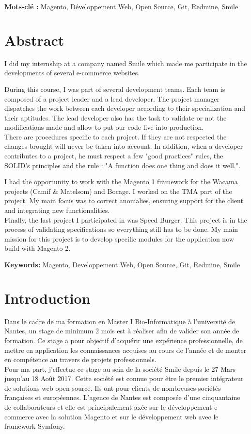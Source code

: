 \documentclass[12pt, a4paper, twoside]{report}
\newcommand{\mychapter}[2]{
	\setcounter{chapter}{#1}
	\setcounter{section}{0}
	\chapter*{#2}
	\addcontentsline{toc}{chapter}{#2}
}
\begin{document}
\textbf{Mots-clé :} Magento, Développement Web, Open Source, Git, Redmine, Smile

\mychapter{-3}{Abstract}

I did my internship at a company named Smile which made me participate in the developments of several e-commerce websites. \vspace{0.1cm}

During this course, I was part of several development teams. Each team is composed of a project leader and a lead developer. The project manager dispatches the work between each developer according to their specialization and their aptitudes. The lead developer also has the task to validate or not the modifications made and allow to put our code live into production. \\
There are procedures specific to each project. If they are not respected the changes brought will never be taken into account. In addition, when a developer contributes to a project, he must respect a few "good practices" rules, the SOLID's principles and the rule : "A function does one thing and does it well.". \vspace{0.1cm}

I had the opportunity to work with the Magento 1 framework for the Wacama projects (Camif \& Matelsom) and Bocage. I worked on the TMA part of the project. My main focus was to correct anomalies, ensuring support for the client and integrating new functionalities. \\

Finally, the last project I participated in was Speed Burger. This project is in the process of validating specifications so everything still has to be done. My main mission for this project is to develop specific modules for the application now build with Magento 2. \vspace{0.1cm}

\textbf{Keywords:} Magento, Developpement Web, Open Source, Git, Redmine, Smile

\mychapter{-2}{Introduction}

Dans le cadre de ma formation en Master I Bio-Informatique à l'université de Nantes, un stage de minimum 2 mois est à réaliser afin de valider son année de formation. Ce stage a pour objectif d'acquérir une expérience professionnelle, de mettre en application les connaissances acquises au cours de l'année et de monter en compétence au travers de projets professionnels. \\

Pour ma part, j'effectue ce stage au sein de la société Smile depuis le 27 Mars jusqu'au 18 Août 2017. Cette société est connue pour être le premier intégrateur de solutions web open-source. Ils ont pour clients de nombreuses sociétés françaises et européennes. L’agence de Nantes est composée d’une cinquantaine de collaborateurs et elle est principalement axée sur le développement e-commerce avec la solution Magento et sur le développement web avec le framework Symfony. \\
\end{document}
